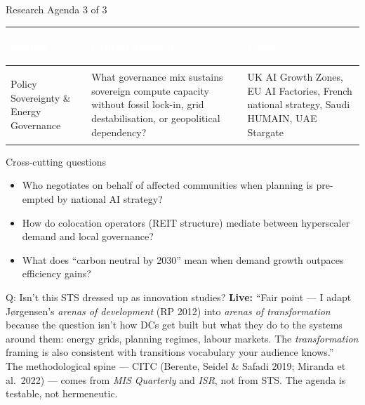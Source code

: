 \documentclass[aspectratio=169,11pt]{beamer}
\newcommand{\iconfull}[2]{\textcolor{#1}{\faIcon{#2}}}
\begin{document}
\begin{frame}[noframenumbering]{\iconfull{dcblue}{map}\enspace Research Agenda 3 of 3}
\vspace{0.3em}
{\footnotesize\setlength{\tabcolsep}{5pt}
\begin{tabularx}{\linewidth}{@{}>{\bfseries\raggedright}p{3cm}XX@{}}
\toprule
\rowcolor{black!88}
\textcolor{white}{\textbf{Agenda}} &
\textcolor{white}{\textbf{Central question}} &
\textcolor{white}{\textbf{Cases}} \\
\midrule
Policy Sovereignty \& Energy Governance &
What governance mix sustains sovereign compute capacity without fossil lock-in, grid destabilisation, or geopolitical dependency? &
UK AI Growth Zones, EU AI Factories, French national strategy, Saudi HUMAIN, UAE Stargate\\[0.5em]
\bottomrule
\end{tabularx}}
\vspace{0.5em}
\begin{block}{Cross-cutting questions}
\footnotesize
\begin{itemize}\setlength\itemsep{0.2em}
  \item Who negotiates on behalf of affected communities when planning is pre-empted by national AI strategy?
  \item How do colocation operators (REIT structure) mediate between hyperscaler demand and local governance?
  \item What does ``carbon neutral by 2030'' mean when demand growth outpaces efficiency gains?
\end{itemize}
\end{block}
\end{frame}

\begin{frame}[noframenumbering]{\enspace Q: Isn't this STS dressed up as innovation studies?}
\footnotesize
\textbf{Live:} ``Fair point — I adapt Jørgensen's \textit{arenas of development} (RP 2012) into \textit{arenas of transformation} because the question isn't how DCs get built but what they do to the systems around them: energy grids, planning regimes, labour markets. The \textit{transformation} framing is also consistent with transitions vocabulary your audience knows.''\\[0.5em]
The methodological spine — CITC (Berente, Seidel \& Safadi 2019; Miranda et al.\ 2022) — comes from \textit{MIS Quarterly} and \textit{ISR}, not from STS. The agenda is testable, not hermeneutic.
\end{frame}
\end{document}
